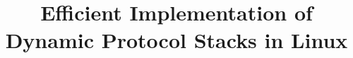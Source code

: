 \documentclass{sig-alternate}
\newcommand{\wolfgang}[1]{\textcolor{blue}{\emph{WM: #1}}}
\begin{document}
%

\title{Efficient Implementation of Dynamic Protocol Stacks in Linux}

%
%
%
%
%
\end{document}
